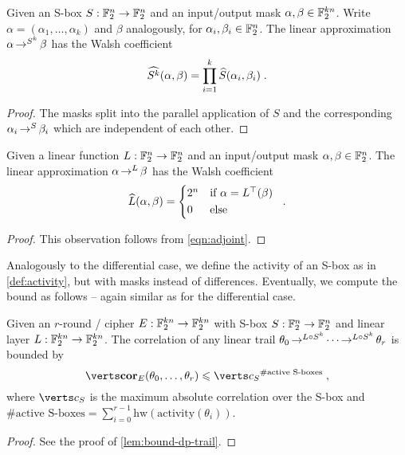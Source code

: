 \begin{lemma}
    Given an S-box $S : \mathbb{F}_2^n \to \mathbb{F}_2^n$ and an input/output mask $\alpha, \beta \in \mathbb{F}_2^{kn}$.
    Write $\alpha = (\alpha_1, \ldots, \alpha_k)$ and $\beta$ analogously, for $\alpha_i, \beta_i \in \mathbb{F}_2^n$.
    The linear approximation $\alpha \operatorname*{\rightarrow}^{S^k}_{} \beta$ has the Walsh coefficient
    \begin{equation*}
        \widehat{S^k}(\alpha, \beta) = \prod_{i=1}^k \widehat{S}(\alpha_i, \beta_i)\;.
    \end{equation*}
\end{lemma}
\begin{proof}
    The masks split into the parallel application of $S$ and the corresponding $\alpha_i \operatorname*{\rightarrow}^{S}_{} \beta_i$ which are independent of each other.
\end{proof}

\begin{lemma}
    Given a linear function $L : \mathbb{F}_2^n \to \mathbb{F}_2^n$ and an input/output mask $\alpha, \beta \in \mathbb{F}_2^n$.
    The linear approximation $\alpha \operatorname*{\rightarrow}^{L}_{} \beta$ has the Walsh coefficient
    \begin{equation*}
        \FC{L}(\alpha, \beta) = \begin{cases*}
            2^n & if $\alpha = L^\top(\beta)$ \\
            0   & else
        \end{cases*}\;.
    \end{equation*}
\end{lemma}
\begin{proof}
    This observation follows from \cref{eqn:adjoint}.
\end{proof}

Analogously to the differential case, we define the activity of an S-box as in \cref{def:activity}, but with masks instead of differences.
Eventually, we compute the bound as follows -- again similar as for the differential case.

\begin{lemma}
    Given an $r$-round \SPN/ cipher $E : \mathbb{F}_2^{kn} \to \mathbb{F}_2^{kn}$ with S-box $S : \mathbb{F}_2^n \to \mathbb{F}_2^n$ and linear layer $L : \mathbb{F}_2^{kn} \to \mathbb{F}_2^{kn}$.
    The correlation of any linear trail $\theta_0 \operatorname*{\rightarrow}^{L \circ S^k}_{} \cdots \operatorname*{\rightarrow}^{L \circ S^k}_{} \theta_r$ is bounded by
    \begin{equation*}
        \abs{\cor_E(\theta_0, \ldots, \theta_r)} \leqslant \abs{c_S}^{\text{\#active S-boxes}}\;,
    \end{equation*}
    where $\abs{c_S}$ is the maximum absolute correlation over the S-box and $\text{\#active S-boxes} = \sum_{i=0}^{r-1} \mathrm{hw}(\mathrm{activity}(\theta_i))$.
\end{lemma}
\begin{proof}
    See the proof of \cref{lem:bound-dp-trail}.
\end{proof}

